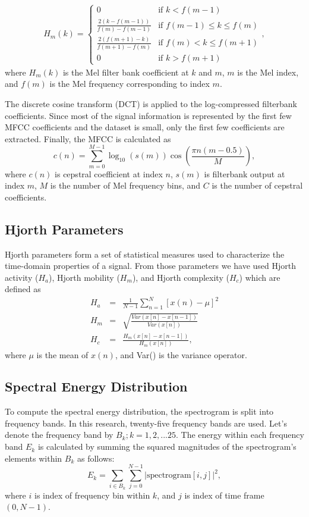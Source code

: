 \documentclass[applsci,article,accept,moreauthors,pdftex]{Definitions/mdpi}
\begin{document}
\begin{align}
	H_m(k) =
	\begin{cases}
		0 & \text{if } k < f(m - 1) \\
		\frac{2(k - f(m - 1))}{f(m) - f(m - 1)} & \text{if } f(m - 1) \leq k \leq f(m) \\
		\frac{2(f(m + 1) - k)}{f(m + 1) - f(m)} & \text{if } f(m) < k \leq f(m + 1) \\
		0 & \text{if } k > f(m + 1)
	\end{cases},
\end{align}
where $H_m(k)$ is the Mel filter bank coefficient at $k$ and $m$, $m$ is the Mel index, and $f(m)$ is the Mel frequency corresponding to index $m$.\par
The discrete cosine transform (DCT) is applied to the log-compressed filterbank coefficients. Since most of the signal information is represented by the first few MFCC coefficients and the dataset is small, only the first few coefficients are extracted. Finally, the MFCC is calculated as
\begin{equation}
	c(n) = \sum_{m=0}^{M-1} \log_{10}(s(m)) \cos\left(\frac{\pi n (m - 0.5)}{M}\right),
\end{equation}
where $c(n)$ is cepstral coefficient at index $n$, $s(m)$ is filterbank output at index $m$, $M$ is the number of Mel frequency bins, and $C$ is the number of cepstral coefficients.
\subsection{Hjorth Parameters}
Hjorth parameters form a set of statistical measures used to characterize the time-domain properties of a signal\cite{wannawijit2019ecg}. From those parameters we have used Hjorth activity ($H_a$), Hjorth mobility ($H_m$), and Hjorth complexity ($H_c$) which are defined as
\begin{eqnarray}
	H_a &=& \frac{1}{N-1} \sum_{n=1}^{N}[x(n) - \mu]^2\\
	H_m &=& \sqrt{\frac{Var(x[n] - x[n-1])}{Var(x[n])}}\\
	H_c &=& \frac{H_m(x[n] - x[n-1])}{H_m(x[n])},
\end{eqnarray}
where $\mu$ is the mean of $x(n)$, and Var() is the variance operator.
\subsection{Spectral Energy Distribution}
To compute the spectral energy distribution, the spectrogram is split into frequency bands. In this research, twenty-five frequency bands are used. Let's denote the frequency band by $B_k;k=1,2,...25$. The energy within each frequency band $E_k$ is calculated by summing the squared magnitudes of the spectrogram's elements within $B_k$ as follows:
\begin{equation}
	E_k = \sum_{i\in B_k} \sum_{j=0}^{N-1} |\text{spectrogram}[i, j]|^2,
\end{equation}
where $i$ is index of frequency bin within $k$, and $j$ is index of time frame $(0,N-1)$.
\end{document}
